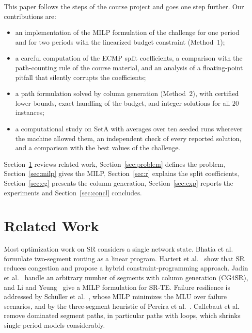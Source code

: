 \documentclass[conference]{IEEEtran}
\begin{document}
This paper follows the steps of the course project and goes one step further. Our contributions are:
\begin{itemize}
\item an implementation of the MILP formulation of the challenge for one period and for two periods with the linearized budget constraint (Method~1);
\item a careful computation of the ECMP split coefficients, a comparison with the path-counting rule of the course material, and an analysis of a floating-point pitfall that silently corrupts the coefficients;
\item a path formulation solved by column generation (Method~2), with certified lower bounds, exact handling of the budget, and integer solutions for all 20 instances;
\item a computational study on SetA with averages over ten seeded runs wherever the machine allowed them, an independent check of every reported solution, and a comparison with the best values of the challenge.
\end{itemize}
Section~\ref{sec:related} reviews related work, Section~\ref{sec:problem} defines the problem, Section~\ref{sec:milp} gives the MILP, Section~\ref{sec:r} explains the split coefficients, Section~\ref{sec:cg} presents the column generation, Section~\ref{sec:exp} reports the experiments and Section~\ref{sec:concl} concludes.

\section{Related Work}\label{sec:related}

Most optimization work on SR considers a single network state. Bhatia et al.~\cite{bhatia2015} formulate two-segment routing as a linear program. Hartert et al.~\cite{hartert2015} show that SR reduces congestion and propose a hybrid constraint-programming approach. Jadin et al.~\cite{cg4sr} handle an arbitrary number of segments with column generation (CG4SR), and Li and Yeung~\cite{li2020} give a MILP formulation for SR-TE. Failure resilience is addressed by Sch\"uller et al.~\cite{schuller2021}, whose MILP minimizes the MLU over failure scenarios, and by the three-segment heuristic of Pereira et al.~\cite{pereira2020}. Callebaut et al.~\cite{callebaut2023} remove dominated segment paths, in particular paths with loops, which shrinks single-period models considerably.
\end{document}
